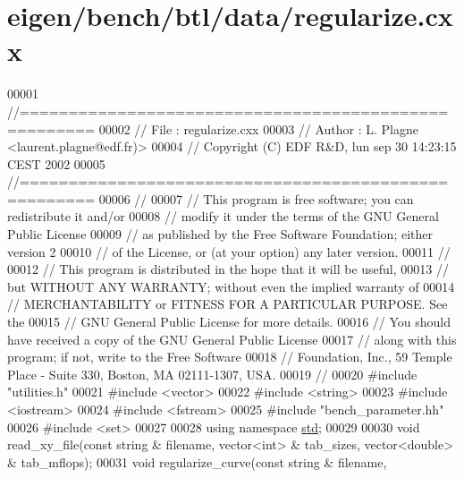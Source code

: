 \hypertarget{eigen_2bench_2btl_2data_2regularize_8cxx_source}{}\section{eigen/bench/btl/data/regularize.cxx}
\label{eigen_2bench_2btl_2data_2regularize_8cxx_source}

\begin{DoxyCode}
00001 \textcolor{comment}{//=====================================================}
00002 \textcolor{comment}{// File   :  regularize.cxx}
00003 \textcolor{comment}{// Author :  L. Plagne <laurent.plagne@edf.fr)>        }
00004 \textcolor{comment}{// Copyright (C) EDF R&D,  lun sep 30 14:23:15 CEST 2002}
00005 \textcolor{comment}{//=====================================================}
00006 \textcolor{comment}{// }
00007 \textcolor{comment}{// This program is free software; you can redistribute it and/or}
00008 \textcolor{comment}{// modify it under the terms of the GNU General Public License}
00009 \textcolor{comment}{// as published by the Free Software Foundation; either version 2}
00010 \textcolor{comment}{// of the License, or (at your option) any later version.}
00011 \textcolor{comment}{// }
00012 \textcolor{comment}{// This program is distributed in the hope that it will be useful,}
00013 \textcolor{comment}{// but WITHOUT ANY WARRANTY; without even the implied warranty of}
00014 \textcolor{comment}{// MERCHANTABILITY or FITNESS FOR A PARTICULAR PURPOSE.  See the}
00015 \textcolor{comment}{// GNU General Public License for more details.}
00016 \textcolor{comment}{// You should have received a copy of the GNU General Public License}
00017 \textcolor{comment}{// along with this program; if not, write to the Free Software}
00018 \textcolor{comment}{// Foundation, Inc., 59 Temple Place - Suite 330, Boston, MA  02111-1307, USA.}
00019 \textcolor{comment}{// }
00020 \textcolor{preprocessor}{#include "utilities.h"}
00021 \textcolor{preprocessor}{#include <vector>}
00022 \textcolor{preprocessor}{#include <string>}
00023 \textcolor{preprocessor}{#include <iostream>}
00024 \textcolor{preprocessor}{#include <fstream>}
00025 \textcolor{preprocessor}{#include "bench\_parameter.hh"}
00026 \textcolor{preprocessor}{#include <set>}
00027 
00028 \textcolor{keyword}{using namespace }\hyperlink{namespacestd}{std};
00029 
00030 \textcolor{keywordtype}{void} read\_xy\_file(\textcolor{keyword}{const} \textcolor{keywordtype}{string} & filename, vector<int> & tab\_sizes, vector<double> & tab\_mflops);
00031 \textcolor{keywordtype}{void} regularize\_curve(\textcolor{keyword}{const} \textcolor{keywordtype}{string} & filename,

\end{DoxyCode}
